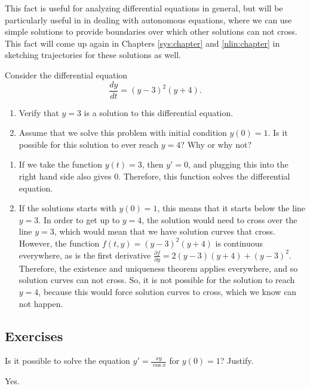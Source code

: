 This fact is useful for analyzing differential equations in general, but will be particularly useful in  in dealing with autonomous equations, where we can use simple solutions to provide boundaries over which other solutions can not cross. This fact will come up again in Chapters \ref{sys:chapter} and \ref{nlin:chapter} in sketching trajectories for these solutions as well. 

\begin{example}
Consider the differential equation 
\begin{equation*}
\frac{dy}{dt} = (y-3)^2(y+4).
\end{equation*}
\begin{enumerate}
\item Verify that $y=3$ is a solution to this differential equation.
\item Assume that we solve this problem with initial condition $y(0) = 1$. Is it possible for this solution to ever reach $y=4$? Why or why not?
\end{enumerate}
\end{example}

\begin{exampleSol}
\begin{enumerate}
\item If we take the function $y(t) = 3$, then $y' = 0$, and plugging this into the right hand side also gives $0$. Therefore, this function solves the differential equation.
\item If the solutions starts with $y(0) = 1$, this means that it starts below the line $y=3$. In order to get up to $y=4$, the solution would need to cross over the line $y=3$, which would mean that we have solution curves that cross. However, the function $f(t,y) = (y-3)^2(y+4)$ is continuous everywhere, as is the first derivative $\frac{\partial f}{\partial y} = 2(y-3)(y+4) + (y-3)^2.$ Therefore, the existence and uniqueness theorem applies everywhere, and so solution curves can not cross. So, it is not possible for the solution to reach $y=4$, because this would force solution curves to cross, which we know can not happen. 
\end{enumerate}
\end{exampleSol}

\subsection{Exercises}

\begin{exercise}
Is it possible to solve the equation $y' = \frac{xy}{\cos x}$ for $y(0) = 1$?
Justify.
\end{exercise}
\comboSol{%
}
{%
Yes.
}

